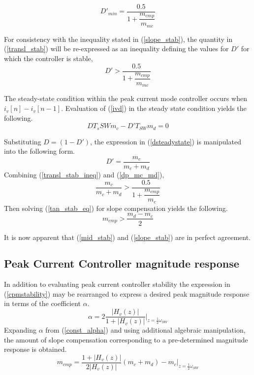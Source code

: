 \documentclass[conference]{IEEEtran}
\begin{document}
\begin{equation}
D'_{min} = \dfrac{0.5}{1 + \dfrac{m_{cmp}}{m_{mc}}} \label{transl_stab}
\end{equation}

For consistency with the inequality stated in (\ref{slope_stab}), the quantity in (\ref{transl_stab}) will be re-expressed as an inequality defining the values for $D'$ for which the controller is stable,
\begin{equation}
D' > \dfrac{0.5}{1 + \dfrac{m_{cmp}}{m_{mc}}} \label{transl_stab_ineq}
\end{equation}

The steady-state condition within the peak current mode controller occurs when $i_v[n] - i_v[n-1]$. Evaluation of (\ref{ivd}) in the steady state condition yields the following.
\begin{equation}
	D T_s{SW} m_c - D' T_{SW} m_d = 0 \label{dsteadystate}
\end{equation}

Substituting $D = (1-D')$, the expression in (\ref{dsteadystate}) is manipulated into the following form.
\begin{equation}
	D' = \dfrac{m_c}{m_c+m_d} \label{dp_mc_md}
\end{equation}
Combining (\ref{transl_stab_ineq}) and (\ref{dp_mc_md}),
\begin{equation}
	\dfrac{m_c}{m_c + m_d} > \dfrac{0.5}{1 + \dfrac{m_{cmp}}{m_c}} \label{tan_stab_eq}
\end{equation}
Then solving (\ref{tan_stab_eq}) for slope compensation yields the following.
\begin{equation}
	m_{cmp} > \dfrac{m_d - m_c}{2} \label{mid_stab}
\end{equation}

It is now apparent that (\ref{mid_stab}) and (\ref{slope_stab}) are in perfect agreement.

\subsection{Peak Current Controller magnitude response}
In addition to evaluating peak current controller stability the expression in (\ref{cpmstability}) may be rearranged to express a desired peak magnitude response in terms of the coefficient $\alpha$.
\begin{equation}
	\alpha =  2 \frac{|H_v(z)|}{1 + |H_v(z)|} \bigg|_{z=\frac{1}{2}\omega_{SW}} 
\end{equation}
Expanding $\alpha$ from (\ref{const_alpha}) and using additional algebraic manipulation, the amount of slope compensation corresponding to a pre-determined magnitude response is obtained.
\begin{equation}
	m_{cmp} = \frac{1 + |H_v(z)|}{2|H_v(z)|}(m_c + m_d) - m_c \bigg|_{z=\frac{1}{2}\omega_{SW}}
\end{equation}
\end{document}
